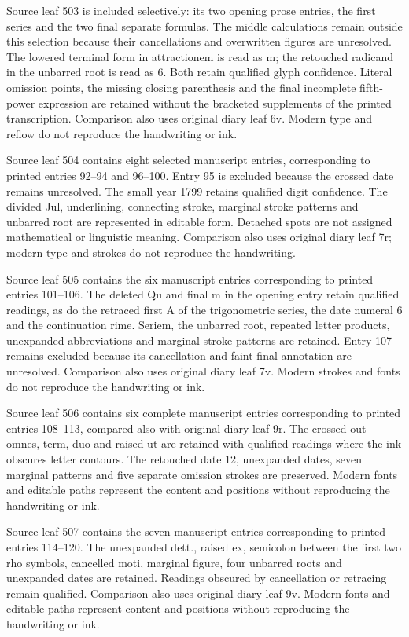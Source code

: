 Source leaf 503 is included selectively: its two opening prose entries, the first series and the two final separate formulas. The middle calculations remain outside this selection because their cancellations and overwritten figures are unresolved. The lowered terminal form in attractionem is read as m; the retouched radicand in the unbarred root is read as 6. Both retain qualified glyph confidence. Literal omission points, the missing closing parenthesis and the final incomplete fifth-power expression are retained without the bracketed supplements of the printed transcription. Comparison also uses original diary leaf 6v. Modern type and reflow do not reproduce the handwriting or ink.

Source leaf 504 contains eight selected manuscript entries, corresponding to printed entries 92–94 and 96–100. Entry 95 is excluded because the crossed date remains unresolved. The small year 1799 retains qualified digit confidence. The divided Jul, underlining, connecting stroke, marginal stroke patterns and unbarred root are represented in editable form. Detached spots are not assigned mathematical or linguistic meaning. Comparison also uses original diary leaf 7r; modern type and strokes do not reproduce the handwriting.

Source leaf 505 contains the six manuscript entries corresponding to printed entries 101–106. The deleted Qu and final m in the opening entry retain qualified readings, as do the retraced first A of the trigonometric series, the date numeral 6 and the continuation rime. Seriem, the unbarred root, repeated letter products, unexpanded abbreviations and marginal stroke patterns are retained. Entry 107 remains excluded because its cancellation and faint final annotation are unresolved. Comparison also uses original diary leaf 7v. Modern strokes and fonts do not reproduce the handwriting or ink.

Source leaf 506 contains six complete manuscript entries corresponding to printed entries 108–113, compared also with original diary leaf 9r. The crossed-out omnes, term, duo and raised ut are retained with qualified readings where the ink obscures letter contours. The retouched date 12, unexpanded dates, seven marginal patterns and five separate omission strokes are preserved. Modern fonts and editable paths represent the content and positions without reproducing the handwriting or ink.

Source leaf 507 contains the seven manuscript entries corresponding to printed entries 114–120. The unexpanded dett., raised ex, semicolon between the first two rho symbols, cancelled moti, marginal figure, four unbarred roots and unexpanded dates are retained. Readings obscured by cancellation or retracing remain qualified. Comparison also uses original diary leaf 9v. Modern fonts and editable paths represent content and positions without reproducing the handwriting or ink.

